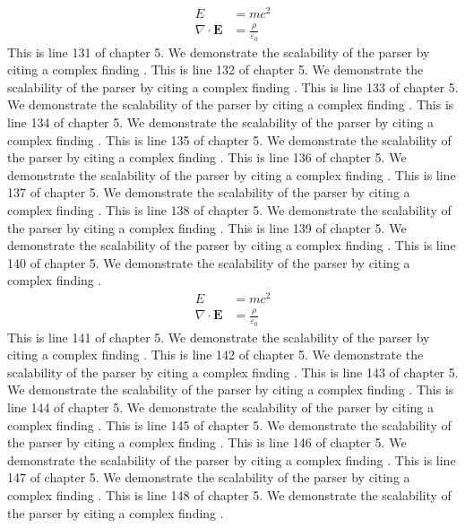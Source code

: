 \begin{align*}
  E &= mc^2 \\
  \nabla \cdot \mathbf{E} &= \frac{\rho}{\varepsilon_0}
\end{align*}
This is line 131 of chapter 5. We demonstrate the scalability of the parser by citing a complex finding \cite{ref5_131}.
This is line 132 of chapter 5. We demonstrate the scalability of the parser by citing a complex finding \cite{ref5_132}.
This is line 133 of chapter 5. We demonstrate the scalability of the parser by citing a complex finding \cite{ref5_133}.
This is line 134 of chapter 5. We demonstrate the scalability of the parser by citing a complex finding \cite{ref5_134}.
This is line 135 of chapter 5. We demonstrate the scalability of the parser by citing a complex finding \cite{ref5_135}.
This is line 136 of chapter 5. We demonstrate the scalability of the parser by citing a complex finding \cite{ref5_136}.
This is line 137 of chapter 5. We demonstrate the scalability of the parser by citing a complex finding \cite{ref5_137}.
This is line 138 of chapter 5. We demonstrate the scalability of the parser by citing a complex finding \cite{ref5_138}.
This is line 139 of chapter 5. We demonstrate the scalability of the parser by citing a complex finding \cite{ref5_139}.
This is line 140 of chapter 5. We demonstrate the scalability of the parser by citing a complex finding \cite{ref5_140}.
\begin{align*}
  E &= mc^2 \\
  \nabla \cdot \mathbf{E} &= \frac{\rho}{\varepsilon_0}
\end{align*}
This is line 141 of chapter 5. We demonstrate the scalability of the parser by citing a complex finding \cite{ref5_141}.
This is line 142 of chapter 5. We demonstrate the scalability of the parser by citing a complex finding \cite{ref5_142}.
This is line 143 of chapter 5. We demonstrate the scalability of the parser by citing a complex finding \cite{ref5_143}.
This is line 144 of chapter 5. We demonstrate the scalability of the parser by citing a complex finding \cite{ref5_144}.
This is line 145 of chapter 5. We demonstrate the scalability of the parser by citing a complex finding \cite{ref5_145}.
This is line 146 of chapter 5. We demonstrate the scalability of the parser by citing a complex finding \cite{ref5_146}.
This is line 147 of chapter 5. We demonstrate the scalability of the parser by citing a complex finding \cite{ref5_147}.
This is line 148 of chapter 5. We demonstrate the scalability of the parser by citing a complex finding \cite{ref5_148}.
